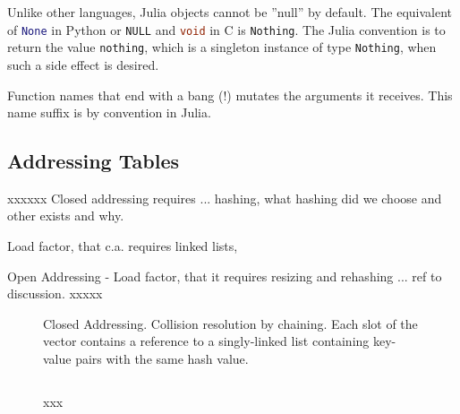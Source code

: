 \documentclass[a4paper, 11pt]{article}
\def\LinkedList#1{%
  \foreach \element in \list {
     \node[node of list, right = of aux, name=ele] {\element};
     \node[node of list, name=aux2, anchor=west] at ([xshift=-.4pt] ele.east) {};
     \draw[link] (aux) -- (ele);
     \coordinate (aux) at (aux2);
   }
   \fill (aux) circle(2pt);
}
\begin{document}
    Unlike other languages, Julia objects cannot be ''null'' by default. The
    equivalent of \lstinline[language=Python]{None} in Python or
    \lstinline[language=C]{NULL} and \lstinline[language=C]{void} in C is
    \texttt{Nothing}. The Julia convention is to return the value
    \texttt{nothing}, which is a singleton instance of type
    \texttt{Nothing}, when such a side effect is
    desired. 
    
    Function names that end with a bang (!) mutates the arguments it receives. 
    This name suffix is by convention in Julia. 
    \subsection*{Addressing Tables}

    xxxxxx
    Closed addressing requires ... hashing, 
    what hashing did we choose and other exists and why.

    Load factor, that c.a. requires linked lists, 

    Open Addressing
    - Load factor, that it requires resizing and rehashing
    ... ref to discussion. 
    xxxxx

    \begin{figure}[h]
    \caption{Closed Addressing.
Collision resolution by chaining. Each slot of the vector contains a reference
to a singly-linked list containing
key-value pairs with the same hash value.}
    \label{code:ClosedAddressing}
    \end{figure}

    \begin{figure}[h]
        \centering
    \begin{verbatim}

    \end{verbatim}
    \caption{xxx} %
    \label{code:xxx} %
    \end{figure}
\end{document}
